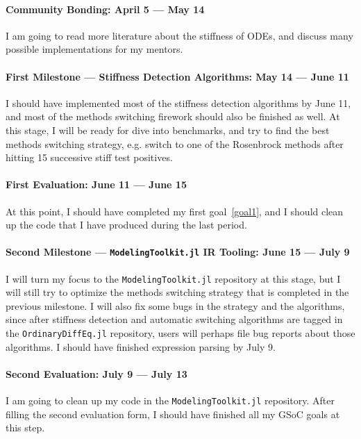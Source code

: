 \documentclass[12pt]{article}
\begin{document}
\paragraph{Community Bonding: April 5 --- May 14}
I am going to read more literature about the stiffness of ODEs, and discuss
many possible implementations for my mentors.

\paragraph{First Milestone --- Stiffness Detection Algorithms: May 14 --- June
11}
I should have implemented most of the stiffness detection algorithms by June
11, and most of the methods switching firework should also be finished as well.
At this stage, I will be ready for dive into benchmarks, and try to find the
best methods switching strategy, e.g. switch to one of the Rosenbrock methods
after hitting 15 successive stiff test positives.

\paragraph{First Evaluation: June 11 --- June 15}
At this point, I should have completed my first goal~\ref{goal1}, and I should
clean up the code that I have produced during the last period.

\paragraph{Second Milestone --- \texttt{ModelingToolkit.jl} IR Tooling: June 15
--- July 9}
I will turn my focus to the \texttt{ModelingToolkit.jl} repository at this
stage, but I will still try to optimize the methods switching strategy that is
completed in the previous milestone. I will also fix some bugs in the strategy
and the algorithms, since after stiffness detection and automatic switching
algorithms are tagged in the \texttt{OrdinaryDiffEq.jl} repository, users will
perhaps file bug reports about those algorithms. I should have finished
expression parsing by July 9.

\paragraph{Second Evaluation: July 9 --- July 13}
I am going to clean up my code in the \texttt{ModelingToolkit.jl} repository.
After filling the second evaluation form, I should have finished all my GSoC
goals at this step.
\end{document}
